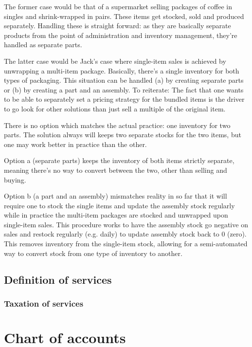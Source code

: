 The former case would be that of a supermarket selling packages of coffee in
singles and shrink-wrapped in pairs. These items get stocked, sold and produced separately.
Handling these is straight forward: as they are basically separate products from the point
of administration and inventory management, they're handled as separate parts.

The latter case would be Jack's case where single-item sales is achieved by unwrapping
a multi-item package. Basically, there's a single inventory for both types of packaging.
This situation can be handled (a) by creating separate parts or (b) by creating a part and an
assembly.
To reiterate: The fact that one wants to be able to separately set a pricing strategy
for the bundled items is the driver to go look for other solutions than just sell a
multiple of the original item.

There is no option which matches the actual practice: one inventory for two parts. The solution
always will keeps two separate stocks for the two items, but one may work better in practice
than the other.

Option a (separate parts) keeps the inventory of both items strictly separate,
meaning there's no way to convert between the two, other than selling and buying.

Option b (a part and an assembly) mismatches reality in so far that it will require one
to stock the single items and update the assembly stock regularly while in practice the
multi-item packages are stocked and unwrapped upon single-item sales. This procedure works
to have the assembly stock go negative on sales and restock regularly (e.g. daily) to
update assembly stock back to 0 (zero). This removes inventory from the single-item stock,
allowing for a semi-automated way to convert stock from one type of inventory to another.


\section{Definition of services}


\subsection{Taxation of services}
\label{subsec:ServiceTaxation}



\chapter{Chart of accounts}
\label{cha:chart-of-accounts}

